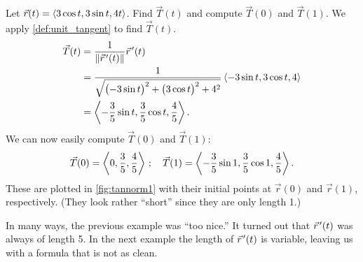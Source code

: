 \begin{example}\label{ex_tannorm1}%
Let $\vec r(t) =\left\langle 3\cos t, 3\sin t, 4t\right\rangle$. Find $\vec T(t)$ and compute $\vec T(0)$ and $\vec T(1)$.
\solution
We apply \autoref{def:unit_tangent} to find $\vec T(t)$. 
\begin{align*}
\vec T(t) &= \frac1{\left\lVert \vec r\hskip1.25pt '(t) \right\rVert}\vec r\hskip1.25pt '(t) \\
				&=\frac{1}{\sqrt{\bigl(-3\sin t\bigr)^2+\bigl(3\cos t\bigr)^2+ 4^2}}\left\langle -3\sin t,3\cos t, 4\right\rangle\\
				&=\left\langle -\frac35\sin t,\frac35\cos t,\frac45\right\rangle.
\end{align*}
We can now easily compute $\vec T(0)$ and $\vec T(1)$:
%
%
\[
\vec T(0) =\bracket{0,\frac35,\frac45}\,;\quad \vec T(1) =\bracket{-\frac35\sin 1,\frac35\cos 1,\frac45}%
.
\]
These are plotted in \autoref{fig:tannorm1} with their initial points at $\vec r(0)$ and $\vec r(1)$, respectively. (They look rather ``short'' since they are only length 1.)
%
\end{example}

In many ways, the previous example was ``too nice.'' It turned out that $\vec r\hskip1.25pt '(t)$ was always of length 5. In the next example the length of $\vec r\hskip1.25pt '(t)$ is variable, leaving us with a formula that is not as clean.

